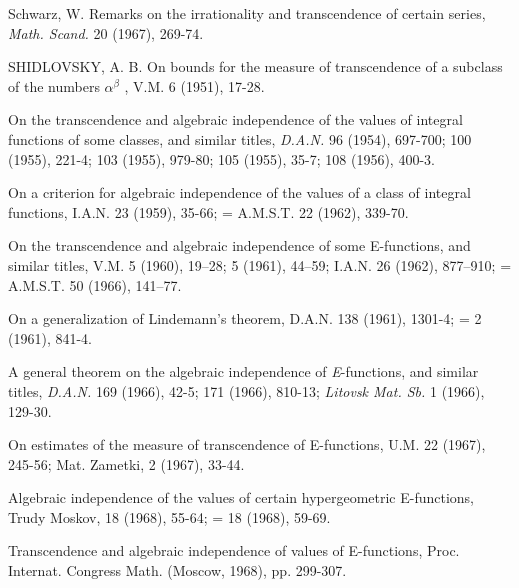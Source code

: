 \begin{hanglist}
    \item Schwarz, W. Remarks on the irrationality and transcendence of certain series, \textit{Math. Scand.} 20 (1967), 269-74.
    \item SHIDLOVSKY, A. B. On bounds for the measure of transcendence of a subclass of the numbers  $\alpha^{\beta}$ , V.M. 6 (1951), 17-28.
    \item \hspace{1.5em} On the transcendence and algebraic independence of the values of integral functions of some classes, and similar titles, \textit{D.A.N.} 96 (1954), 697-700; 100 (1955), 221-4; 103 (1955), 979-80; 105 (1955), 35-7; 108 (1956), 400-3.
    \item \hspace{1.5em} On a criterion for algebraic independence of the values of a class of integral functions, I.A.N. 23 (1959), 35-66; = A.M.S.T. 22 (1962), 339-70.
    \item \hspace{1.5em} On the transcendence and algebraic independence of some E-functions, and similar titles, V.M. 5 (1960), 19–28; 5 (1961), 44–59; I.A.N. 26 (1962), 877–910; = A.M.S.T. 50 (1966), 141–77.
    \item \hspace{1.5em} On a generalization of Lindemann's theorem, D.A.N. 138 (1961), 1301-4; = 2 (1961), 841-4.
    \item \hspace{1.5em} A general theorem on the algebraic independence of \textit{E}-functions, and similar titles, \textit{D.A.N.} 169 (1966), 42-5; 171 (1966), 810-13; \textit{Litovsk Mat. Sb.} 1 (1966), 129-30.
    \item \hspace{1.5em} On estimates of the measure of transcendence of E-functions, U.M. 22 (1967), 245-56; Mat. Zametki, 2 (1967), 33-44.
    \item \hspace{1.5em} Algebraic independence of the values of certain hypergeometric E-functions, Trudy Moskov, 18 (1968), 55-64; = 18 (1968), 59-69.
    \item \hspace{1.5em} Transcendence and algebraic independence of values of E-functions, Proc. Internat. Congress Math. (Moscow, 1968), pp. 299-307.

\end{hanglist}

